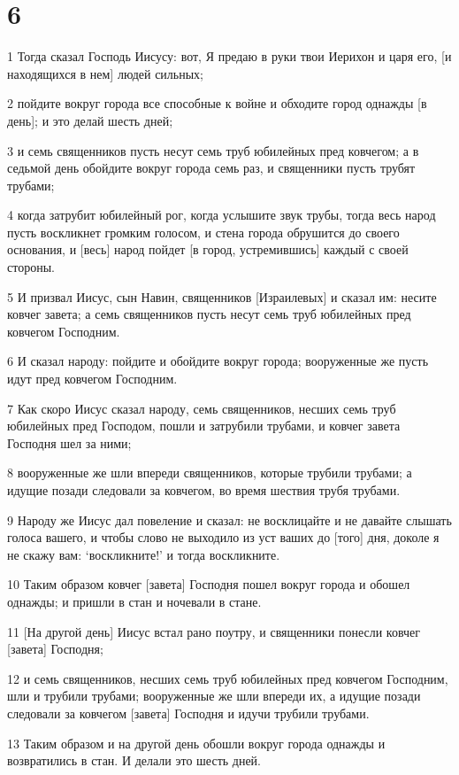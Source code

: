\chapter{6}

\par 1 Тогда сказал Господь Иисусу: вот, Я предаю в руки твои Иерихон и царя его, [и находящихся в нем] людей сильных;
\par 2 пойдите вокруг города все способные к войне и обходите город однажды [в день]; и это делай шесть дней;
\par 3 и семь священников пусть несут семь труб юбилейных пред ковчегом; а в седьмой день обойдите вокруг города семь раз, и священники пусть трубят трубами;
\par 4 когда затрубит юбилейный рог, когда услышите звук трубы, тогда весь народ пусть воскликнет громким голосом, и стена города обрушится до своего основания, и [весь] народ пойдет [в город, устремившись] каждый с своей стороны.
\par 5 И призвал Иисус, сын Навин, священников [Израилевых] и сказал им: несите ковчег завета; а семь священников пусть несут семь труб юбилейных пред ковчегом Господним.
\par 6 И сказал народу: пойдите и обойдите вокруг города; вооруженные же пусть идут пред ковчегом Господним.
\par 7 Как скоро Иисус сказал народу, семь священников, несших семь труб юбилейных пред Господом, пошли и затрубили трубами, и ковчег завета Господня шел за ними;
\par 8 вооруженные же шли впереди священников, которые трубили трубами; а идущие позади следовали за ковчегом, во время шествия трубя трубами.
\par 9 Народу же Иисус дал повеление и сказал: не восклицайте и не давайте слышать голоса вашего, и чтобы слово не выходило из уст ваших до [того] дня, доколе я не скажу вам: `воскликните!' и тогда воскликните.
\par 10 Таким образом ковчег [завета] Господня пошел вокруг города и обошел однажды; и пришли в стан и ночевали в стане.
\par 11 [На другой день] Иисус встал рано поутру, и священники понесли ковчег [завета] Господня;
\par 12 и семь священников, несших семь труб юбилейных пред ковчегом Господним, шли и трубили трубами; вооруженные же шли впереди их, а идущие позади следовали за ковчегом [завета] Господня и идучи трубили трубами.
\par 13 Таким образом и на другой день обошли вокруг города однажды и возвратились в стан. И делали это шесть дней.
